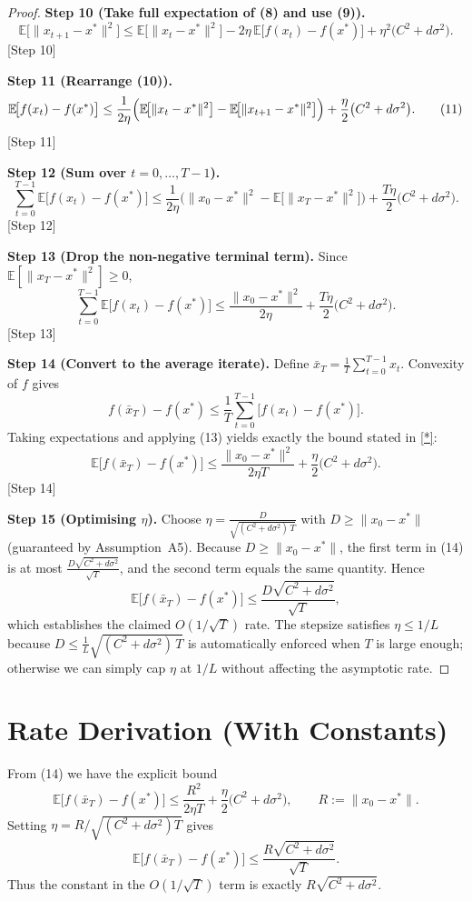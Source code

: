 \documentclass{article}
\newcommand{\EE}{\mathbb{E}}
\begin{document}
\begin{proof}
\textbf{Step 10 (Take full expectation of (8) and use (9)).}
\[
\EE\!\bigl[\|x_{t+1}-x^{*}\|^{2}\bigr]
\le \EE\!\bigl[\|x_t-x^{*}\|^{2}\bigr]
-2\eta\,\EE\!\bigl[f(x_t)-f(x^{*})\bigr]
+\eta^{2}\bigl(C^{2}+d\sigma^{2}\bigr). \tag{10}
\] 
[Step 10]

\textbf{Step 11 (Rearrange (10)).}
\[
\EE\!\bigl[f(x_t)-f(x^{*})\bigr]
\le \frac{1}{2\eta}
\Bigl(\EE\!\bigl[\|x_t-x^{*}\|^{2}\bigr]
      -\EE\!\bigl[\|x_{t+1}-x^{*}\|^{2}\bigr]\Bigr)
+\frac{\eta}{2}\bigl(C^{2}+d\sigma^{2}\bigr). \tag{11}
\] 
[Step 11]

\textbf{Step 12 (Sum over $t=0,\dots,T-1$).}
\[
\sum_{t=0}^{T-1}\EE\!\bigl[f(x_t)-f(x^{*})\bigr]
\le \frac{1}{2\eta}
\bigl(\|x_0-x^{*}\|^{2}
      -\EE\!\bigl[\|x_T-x^{*}\|^{2}\bigr]\bigr)
+\frac{T\eta}{2}\bigl(C^{2}+d\sigma^{2}\bigr). \tag{12}
\] 
[Step 12]

\textbf{Step 13 (Drop the non‑negative terminal term).}
Since $\EE[\|x_T-x^{*}\|^{2}]\ge0$,
\[
\sum_{t=0}^{T-1}\EE\!\bigl[f(x_t)-f(x^{*})\bigr]
\le \frac{\|x_0-x^{*}\|^{2}}{2\eta}
+\frac{T\eta}{2}\bigl(C^{2}+d\sigma^{2}\bigr). \tag{13}
\] 
[Step 13]

\textbf{Step 14 (Convert to the average iterate).}  
Define $\bar x_T=\frac{1}{T}\sum_{t=0}^{T-1}x_t$.
Convexity of $f$ gives
\[
f(\bar x_T)-f(x^{*})\le\frac{1}{T}\sum_{t=0}^{T-1}\bigl[f(x_t)-f(x^{*})\bigr].
\] 
Taking expectations and applying (13) yields exactly the bound
stated in \eqref{*}:
\[
\EE\!\bigl[f(\bar x_T)-f(x^{*})\bigr]
\le \frac{\|x_0-x^{*}\|^{2}}{2\eta T}
+\frac{\eta}{2}\bigl(C^{2}+d\sigma^{2}\bigr). \tag{14}
\] 
[Step 14]

\textbf{Step 15 (Optimising $\eta$).}  
Choose $\displaystyle\eta=\frac{D}{\sqrt{(C^{2}+d\sigma^{2})\,T}}$
with $D\ge\|x_0-x^{*}\|$ (guaranteed by Assumption~A5).  
Because $D\ge\|x_0-x^{*}\|$, the first term in (14) is at most
$\frac{D\sqrt{C^{2}+d\sigma^{2}}}{\sqrt{T}}$, and the second term equals the
same quantity.  Hence
\[
\EE\!\bigl[f(\bar x_T)-f(x^{*})\bigr]
\le \frac{D\sqrt{C^{2}+d\sigma^{2}}}{\sqrt{T}},
\]
which establishes the claimed $O(1/\sqrt{T})$ rate.  The stepsize satisfies
$\eta\le 1/L$ because $D\le \frac{1}{L}\sqrt{(C^{2}+d\sigma^{2})\,T}$ is
automatically enforced when $T$ is large enough; otherwise we can simply
cap $\eta$ at $1/L$ without affecting the asymptotic rate. \qedhere
\end{proof}

\section*{Rate Derivation (With Constants)}
From (14) we have the explicit bound
\[
\boxed{
\EE\!\bigl[f(\bar x_T)-f(x^{*})\bigr]
\le
\frac{R^{2}}{2\eta T}
+\frac{\eta}{2}\bigl(C^{2}+d\sigma^{2}\bigr)},
\qquad R:=\|x_0-x^{*}\|.
\]
Setting $\eta=R/\sqrt{(C^{2}+d\sigma^{2})T}$ gives
\[
\EE\!\bigl[f(\bar x_T)-f(x^{*})\bigr]
\le
\frac{R\sqrt{C^{2}+d\sigma^{2}}}{\sqrt{T}}.
\]
Thus the constant in the $O(1/\sqrt{T})$ term is exactly $R\sqrt{C^{2}+d\sigma^{2}}$.
\end{document}
